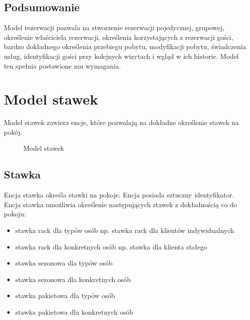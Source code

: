 \documentclass[a4paper,onecolumn,oneside,11pt,wide,floatssmall]{mwrep}
\theoremstyle{definition}
\theoremstyle{plain}%
\theoremstyle{remark}
\begin{document}
\subsection{Podsumowanie}
Model rezerwacji pozwala na stworzenie rezerwacji pojedycznej, grupowej, określenie właściciela rezerwacji, określenia korzystających z rezerwacji gości, bardzo dokładnego określenia przebiegu pobytu, modyfikacji pobytu, świadczenia usług, identyfikacji gości przy kolejnych wizytach i wgląd w ich historie. Model ten spełnia postawione mu wymagania.


\section{Model stawek}
Model stawek zawiera encje, które pozwalają na dokładne określenie stawek na pokój. 


\begin{figure}[H]
  \begin{center}
  \end{center}
  \caption{Model stawek}
  \label{fig:db-logical-model-rates}
\end{figure}

\subsection{Stawka}
Encja stawka określa stawki na pokoje. Encja posiada sztuczny identyfikator. Encja stawka umożliwia określenie następujących stawek z dokładnością co do pokoju:

\begin{itemize}
  \item stawka rack dla typów osób np. stawka rack dla klientów indywidualnych
  \item stawka rack dla konkretnych osób np. stawka dla klienta stałego
  \item stawka sezonowa dla typów osób
  \item stawka sezonowa dla konkretnych osób
  \item stawka pakietowa dla typów osób
  \item stawka pakietowa dla konkretnych osób
\end{itemize}
\end{document}
